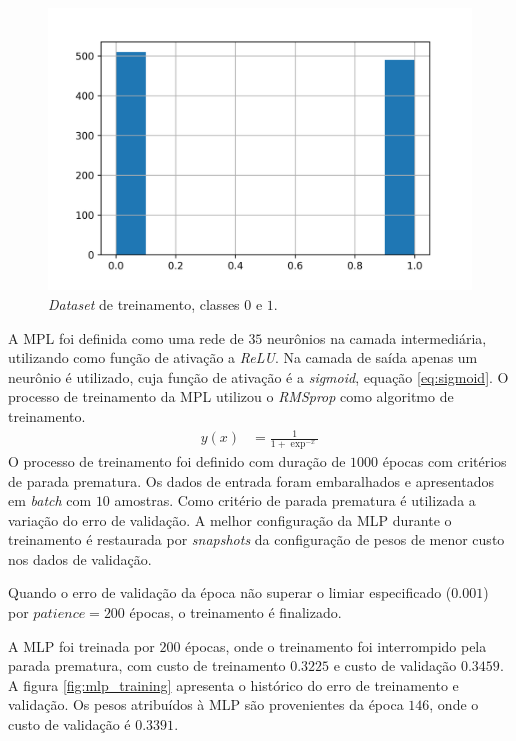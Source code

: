 \documentclass{article}
\begin{document}
    \begin{figure}[H]
        \centering
        \includegraphics[width=\linewidth]{mlp_out_scaled.png}   
        \caption{\textit{Dataset} de treinamento, classes $0$ e $1$.}
        \label{fig:out_data_scaled}
    \end{figure}
    A MPL foi definida como uma rede de $35$ neurônios na camada intermediária, utilizando
    como função de ativação a \textit{ReLU}. Na camada de saída apenas um neurônio é utilizado,
    cuja função de ativação é a \textit{sigmoid}, equação \ref{eq:sigmoid}.
    O processo de treinamento da MPL utilizou o \textit{RMSprop} como algoritmo de treinamento.
    \begin{align}
        y(x) &= \frac{1}{1 + \exp^{-x}}
        \label{eq:sigmoid}
    \end{align}
    O processo de treinamento foi definido com duração de $1000$ épocas com critérios de 
    parada prematura. Os dados de entrada foram embaralhados e apresentados
    em \textit{batch} com $10$ amostras.
    Como critério de parada prematura é utilizada a variação do erro de validação. A melhor configuração
    da MLP durante o treinamento é restaurada por \textit{snapshots} da configuração de pesos de menor custo
    nos dados de validação.

    Quando o erro de validação da época não superar o limiar especificado ($0.001$) por $patience=200$ épocas,
    o treinamento é finalizado.
    
    A MLP foi treinada por $200$ épocas, onde o treinamento foi interrompido pela
    parada prematura, com custo de treinamento $0.3225$ e custo de validação
    $0.3459$. A figura \ref{fig:mlp_training} apresenta o histórico do erro de treinamento
    e validação. Os pesos atribuídos à MLP são provenientes da época $146$, onde o custo de validação
    é $0.3391$.
\end{document}
